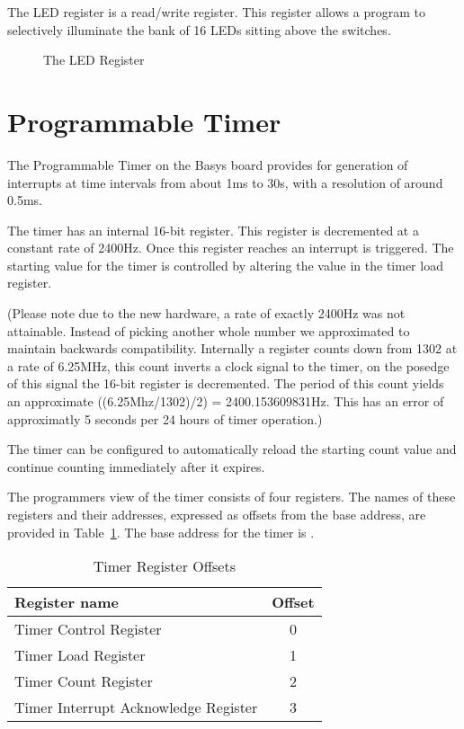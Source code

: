 The LED register is a read/write register. This
register allows a program to selectively illuminate the bank of 16 LEDs
sitting above the switches.

\begin{figure}[h]
\begin{center}
\caption{The LED Register}
\label{LED_pic}
\end{center}
\end{figure}


\section{Programmable Timer}

The Programmable Timer on the Basys board provides for generation of
interrupts at time intervals from about 1ms to 30s, with a resolution
of around 0.5ms.

The timer has an internal 16-bit register. This register is
decremented at a constant rate of 2400Hz.
Once this register reaches
 an interrupt is triggered. The starting value for the
timer is controlled by altering the value in the timer load register.

(Please note due to the new hardware, a rate of exactly 2400Hz was not attainable.
Instead of picking another whole number we approximated
to maintain backwards compatibility. Internally a register counts down from 1302 
at a rate of 6.25MHz, this count inverts a clock signal to the timer,
on the posedge of this signal the 16-bit register is decremented.
The period of this count yields an approximate ((6.25Mhz/1302)/2) = 2400.153609831Hz.
This has an error of approximatly 5 seconds per 24 hours of timer operation.)

The timer can be configured to automatically reload the starting count
value and continue counting immediately after it expires.

The programmers view of the timer consists of four registers.  The
names of these registers and their addresses, expressed as offsets
from the base address, are provided in
Table~\ref{table:timer_offsets}.  The base address for the timer is
\src{\LOCTIMEBASE}.

\begin{table}[h]
\begin{center}
\begin{tabular}{|l|c|}
\hline
\textbf{Register name} & \textbf{Offset} \\
\hline
Timer Control Register & 0 \\
\hline
Timer Load Register & 1 \\
\hline
Timer Count Register & 2 \\
\hline
Timer Interrupt Acknowledge Register & 3 \\
\hline
\end{tabular}
\caption{Timer Register Offsets}
\label{table:timer_offsets}
\end{center}
\end{table}


